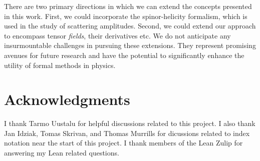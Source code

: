 \documentclass[a4paper, 11pt]{article}
\begin{document}
There are two primary directions in which we can extend the concepts presented in this work. 
First, we could incorporate the spinor-helicity formalism, which is used in the study of scattering 
amplitudes. Second, we could extend our approach to encompass tensor \emph{fields}, their derivatives
etc. We do not anticipate any insurmountable challenges in pursuing these extensions. 
They represent promising avenues for future research and have the potential to significantly enhance
the utility of formal methods in physics.
\section*{Acknowledgments}
I thank Tarmo Uustalu for helpful discussions related to this project.
I also thank Jan Idziak, Tomas Skrivan, and Thomas Murrills for 
dicussions related to index notation near the start of this project. 
I thank members of the Lean Zulip for answering my Lean related questions.


\begin{spacing}{0.5}

\end{spacing}
\end{document}
